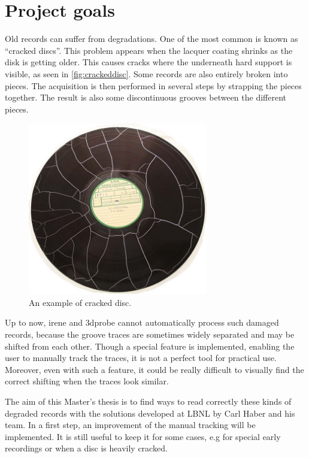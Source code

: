 \section{Project goals}

Old records can suffer from degradations. One of the most common is known as ``cracked discs''. This problem appears when the lacquer coating shrinks as the disk is getting older. This causes cracks where the underneath hard support is visible, as seen in \autoref{fig:crackeddisc}. Some records are also entirely broken into pieces. The acquisition is then performed in several steps by strapping the pieces together. The result is also some discontinuous grooves between the different pieces.

\begin{figure}[!ht]
\centering
\includegraphics[width=0.7\textwidth]{images/cracked-disc}
\caption{An example of cracked disc.}
\label{fig:crackeddisc}
\end{figure}

Up to now, \gls{irene} and \gls{3dprobe} cannot automatically process such damaged records, because the groove traces are sometimes widely separated and may be shifted from each other. Though a special feature is implemented, enabling the user to manually track the traces, it is not a perfect tool for practical use. Moreover, even with such a feature, it could be really difficult to visually find the correct shifting when the traces look similar.

The aim of this Master's thesis is to find ways to read correctly these kinds of degraded records with the solutions developed at LBNL by Carl Haber and his team. In a first step, an improvement of the manual tracking will be implemented. It is still useful to keep it for some cases, e.g for special early recordings or when a disc is heavily cracked.

